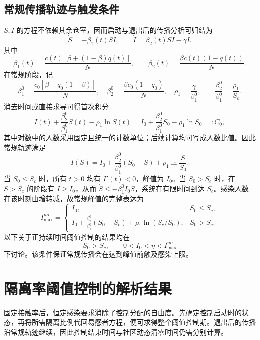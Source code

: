 \documentclass[lang=cn,a4paper,newtx]{elegantpaper}
\numberwithin{equation}{section}
\theoremstyle{plain}
\begin{document}
\subsection{常规传播轨迹与触发条件}
$S,I$ 的方程不依赖其余仓室，因而启动与退出后的传播分析可归结为
\begin{equation}
\dot S=-\beta_1(t)SI,\qquad \dot I=\beta_2(t)SI-\gamma I.
\label{eq:model:reduced-si}
\end{equation}
其中
\begin{equation}
\beta_1(t)=\frac{c(t)[\beta+(1-\beta)q(t)]}{N},\qquad
\beta_2(t)=\frac{\beta c(t)(1-q(t))}{N}.
\label{eq:model:beta12-general}
\end{equation}
在常规阶段，记
\begin{equation}
\beta_1^0=\frac{c_0[\beta+q_0(1-\beta)]}{N},\quad
\beta_2^0=\frac{\beta c_0(1-q_0)}{N},\quad
\rho_1=\frac{\gamma}{\beta_1^0},\qquad
\frac{\beta_2^0}{\beta_1^0}=\frac{\rho_1}{S_c}.
\label{eq:model:beta12-baseline}
\end{equation}
消去时间或直接求导可得首次积分\cite{Zhou2024SPCI}
\begin{equation}
I(t)+\frac{\beta_2^0}{\beta_1^0}S(t)-\rho_1\ln S(t)=I_0+\frac{\beta_2^0}{\beta_1^0}S_0-\rho_1\ln S_0=:C_0,
\label{eq:model:first-integral}
\end{equation}
其中对数中的人数采用固定且统一的计数单位；后续计算均可写成人数比值。因此常规轨迹满足
\begin{equation}
I(S)=I_0+\frac{\beta_2^0}{\beta_1^0}(S_0-S)+\rho_1\ln\frac{S}{S_0}.
\label{eq:model:routine-orbit}
\end{equation}
当 $S_0\le S_c$ 时，所有 $t>0$ 均有 $I'(t)<0$，峰值为 $I_0$。当 $S_0>S_c$ 时，在 $S>S_c$ 的阶段有 $I\ge I_0$，从而 $\dot S\le-\beta_1^0 I_0S$，系统在有限时间到达 $S_c$。感染人数在该时刻由增转减，故常规峰值的完整表达为
\begin{equation}
I_{\max}^{no}=\begin{cases}
I_0,&S_0\le S_c,\\
I_0+\frac{\beta_2^0}{\beta_1^0}(S_0-S_c)+\rho_1\ln(S_c/S_0),&S_0>S_c.
\end{cases}
\label{eq:s1:Imax-no}
\end{equation}
以下关于正持续时间阈值控制的结果均在
\begin{equation}
S_0>S_c,\qquad 0<I_0<\eta<I_{\max}^{no}
\label{eq:model:trigger}
\end{equation}
下讨论。该条件保证常规传播会在达到峰值前触及感染上限。


\section{隔离率阈值控制的解析结果}
\label{sec:s1}
固定接触率后，恒定感染要求消除了控制分配的自由度。先确定控制启动时的状态，再将所需隔离比例代回易感者方程，便可求得整个阈值控制期。退出后的传播沿常规轨迹继续，因此控制结束时间与社区动态清零时间仍需分别计算。
\end{document}
